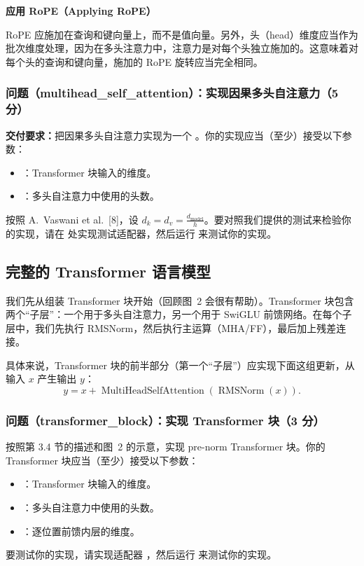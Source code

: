 \textbf{应用 RoPE（Applying RoPE）}

RoPE 应施加在查询和键向量上，而不是值向量。另外，头（head）维度应当作为批次维度处理，因为在多头注意力中，注意力是对每个头独立施加的。这意味着对每个头的查询和键向量，施加的 RoPE 旋转应当完全相同。

\subsubsection*{问题（multihead\_self\_attention）：实现因果多头自注意力（5 分）}

\textbf{交付要求：}把因果多头自注意力实现为一个 。你的实现应当（至少）接受以下参数：
\begin{itemize}
  \item {}：Transformer 块输入的维度。
  \item {}：多头自注意力中使用的头数。
\end{itemize}
按照 A.~Vaswani et al.~[8]，设 $d_k = d_v = \tfrac{d_{\mathrm{model}}}{h}$。要对照我们提供的测试来检验你的实现，请在  处实现测试适配器，然后运行  来测试你的实现。

\subsection{完整的 Transformer 语言模型}

我们先从组装 Transformer 块开始（回顾图~2 会很有帮助）。Transformer 块包含两个``子层''：一个用于多头自注意力，另一个用于 SwiGLU 前馈网络。在每个子层中，我们先执行 RMSNorm，然后执行主运算（MHA/FF），最后加上残差连接。

具体来说，Transformer 块的前半部分（第一个``子层''）应实现下面这组更新，从输入 $x$ 产生输出 $y$：
\begin{equation}
y = x + \operatorname{MultiHeadSelfAttention}(\operatorname{RMSNorm}(x)).
\tag{15}
\end{equation}

\subsubsection*{问题（transformer\_block）：实现 Transformer 块（3 分）}

按照第 3.4 节的描述和图~2 的示意，实现 pre-norm Transformer 块。你的 Transformer 块应当（至少）接受以下参数：
\begin{itemize}
  \item {}：Transformer 块输入的维度。
  \item {}：多头自注意力中使用的头数。
  \item {}：逐位置前馈内层的维度。
\end{itemize}
要测试你的实现，请实现适配器 ，然后运行  来测试你的实现。

